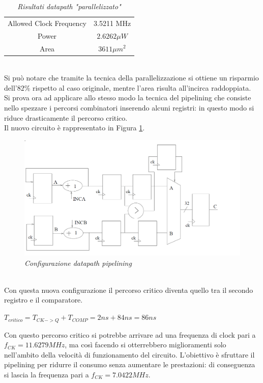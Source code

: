 {\begin{table}[!h]
\begin{tabular}{|c|c|}
		Allowed Clock Frequency & 3.5211 MHz\\
		Power & $2.6262\mu W$\\
		Area & $3611 \mu m^{2}$\\
		\hline
	\end{tabular}
	\caption{\textit{Risultati datapath "parallelizzato"}}
	\label{Tab33_4}
\end{table}\\
Si può notare che tramite la tecnica della parallelizzazione si ottiene un risparmio dell'$82\%$ rispetto al caso originale, mentre l'area risulta all'incirca raddoppiata.
\\
Si prova ora ad applicare allo stesso modo la tecnica del pipelining che consiste nello spezzare i percorsi combinatori inserendo alcuni registri: in questo modo si riduce drasticamente il percorso critico. \\
Il nuovo circuito è rappresentato in Figura \ref{circuito_pipe}.
\begin{figure}[!htb]
	\centering
	\includegraphics[scale=0.8]{immagini/circuito_pipe}
	\caption{\textit{Configurazione datapath pipelining}}
	\label{circuito_pipe}
\end{figure}
\\
Con questa nuova configurazione il percorso critico diventa quello tra il secondo registro e il comparatore.
\begin{center}
	$T_{critico}=T_{CK->Q}+T_{COMP}=2 ns + 84 ns = 86 ns$
\end{center}
Con questo percorso critico si potrebbe arrivare ad una frequenza di clock pari a $f_{CK}=11.6279 MHz$, ma così facendo si otterrebbero miglioramenti solo nell'ambito della velocità di funzionamento del circuito. L'obiettivo è sfruttare il pipelining per ridurre il consumo senza aumentare le prestazioni: di conseguenza si lascia la frequenza pari a $f_{CK}=7.0422 MHz$. \\
}
